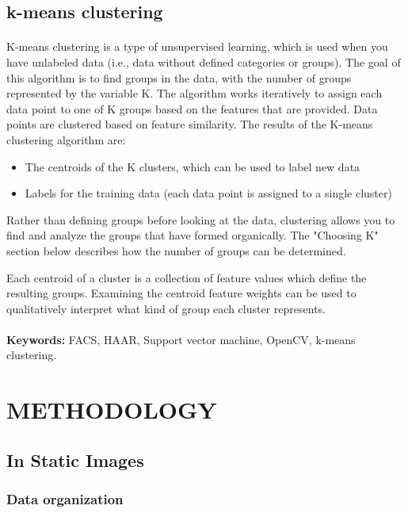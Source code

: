 \documentclass[a4paper,12pt,oneside]{article}
\begin{document}
\subsection{k-means clustering }
\paragraph{}
K-means clustering is a type of unsupervised learning, which is used when you have unlabeled data (i.e., data without defined categories or groups). The goal of this algorithm is to find groups in the data, with the number of groups represented by the variable K. The algorithm works iteratively to assign each data point to one of K groups based on the features that are provided. Data points are clustered based on feature similarity. The results of the K-means clustering algorithm are:
 
\begin{itemize}
   \item The centroids of the K clusters, which can be used to label new data
   \item Labels for the training data (each data point is assigned to a single cluster)
\end{itemize}
Rather than defining groups before looking at the data, clustering allows you to find and analyze the groups that have formed organically. The "Choosing K" section below describes how the number of groups can be determined.  

Each centroid of a cluster is a collection of feature values which define the resulting groups. Examining the centroid feature weights can be used to qualitatively interpret what kind of group each cluster represents.  



\paragraph{}
\textbf{Keywords:}  FACS, HAAR, Support vector machine,
OpenCV, k-means clustering.

\newpage
\section{METHODOLOGY}
\subsection{In Static Images}

\subsubsection{Data organization}
\end{document}
